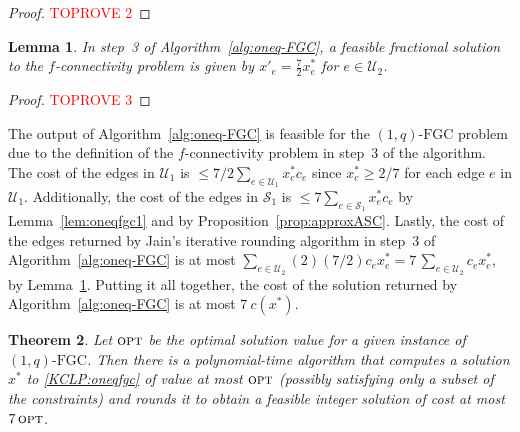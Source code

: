 \documentclass[11pt]{article}
\newtheorem{theorem}{Theorem}
\newtheorem{lemma}[theorem]{Lemma}
\newcommand{\opt}{\textsc{opt}}
\newcommand{\safe}{\mathscr{S}}
\newcommand{\unsafe}{\mathscr{U}}
\newcommand{\fgc}{\mathrm{FGC}}
\newcommand{\oneqfgc}{(1,q)\text{-}\fgc}
\newcommand{\oneqfgcapx}{7}
\begin{document}
{{\begin{proof}\textcolor{red}{TOPROVE 2}\end{proof}

\begin{lemma}\label{lem:oneqfgc2}
In step~3 of Algorithm~\ref{alg:oneq-FGC}, a feasible fractional
solution to the $f$-connectivity problem is given by
	$x'_e = \frac{7}{2} x^*_e$ for $e\in \unsafe_{2}$.
\end{lemma}

\begin{proof}\textcolor{red}{TOPROVE 3}\end{proof}

The output of Algorithm~\ref{alg:oneq-FGC} is feasible for the
$\oneqfgc$ problem due to the definition of the $f$-connectivity
problem in step~3 of the algorithm. The cost of the edges in
$\unsafe_{1}$ is $\leq {7/2} \sum_{e\in \unsafe_{1}}x^*_e c_e$ since
$x^*_e \geq 2/7$ for each edge $e$ in $\unsafe_{1}$. Additionally,
the cost of the edges in $\safe_1$ is $\leq 7 \sum_{e\in \safe_1}x^*_e c_e$
by Lemma~\ref{lem:oneqfgc1} and by Proposition~\ref{prop:approxASC}.
Lastly, the cost of the edges returned by Jain's iterative rounding
algorithm in step~3 of Algorithm~\ref{alg:oneq-FGC} is at most
$\sum_{e\in \unsafe_{2}}(2)(7/2) c_e x^*_e = 7\,\sum_{e\in \unsafe_{2}}c_e x^*_e$,
by Lemma~\ref{lem:oneqfgc2}.
Putting it all together, the cost of the solution returned by
Algorithm~\ref{alg:oneq-FGC} is at most $\oneqfgcapx\ c(x^*)$.
}


\begin{theorem} \label{thm:approx-oneqfgc}
Let $\opt$ be the optimal solution value for a given instance of $\oneqfgc$. Then there is a polynomial-time algorithm that computes a solution $x^*$ to \eqref{KCLP:oneqfgc} of value at most $\opt$ (possibly satisfying only a subset of the constraints) and rounds it to obtain a feasible integer solution of cost at most $\oneqfgcapx\, \opt$.
\end{theorem}
}
\end{document}

